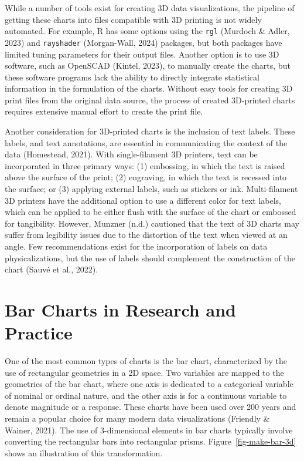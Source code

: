 \documentclass[phd]{nuthesis}
\begin{document}
While a number of tools exist for creating 3D data visualizations, the
pipeline of getting these charts into files compatible with 3D printing
is not widely automated. For example, R has some options using the
\texttt{rgl} (Murdoch \& Adler, 2023) and \texttt{rayshader}
(Morgan-Wall, 2024) packages, but both packages have limited tuning
parameters for their output files. Another option is to use 3D software,
such as OpenSCAD (Kintel, 2023), to manually create the charts, but
these software programs lack the ability to directly integrate
statistical information in the formulation of the charts. Without easy
tools for creating 3D print files from the original data source, the
process of created 3D-printed charts requires extensive manual effort to
create the print file.

Another consideration for 3D-printed charts is the inclusion of text
labels. These labels, and text annotations, are essential in
communicating the context of the data (Homestead, 2021). With
single-filament 3D printers, text can be incorporated in three primary
ways: (1) embossing, in which the text is raised above the surface of
the print; (2) engraving, in which the text is recessed into the
surface; or (3) applying external labels, such as stickers or ink.
Multi-filament 3D printers have the additional option to use a different
color for text labels, which can be applied to be either flush with the
surface of the chart or embossed for tangibility. However, Munzner
(n.d.) cautioned that the text of 3D charts may suffer from legibility
issues due to the distortion of the text when viewed at an angle. Few
recommendations exist for the incorporation of labels on data
physicalizations, but the use of labels should complement the
construction of the chart (Sauvé et al., 2022).

\section{Bar Charts in Research and
Practice}\label{bar-charts-in-research-and-practice}

One of the most common types of charts is the bar chart, characterized
by the use of rectangular geometries in a 2D space. Two variables are
mapped to the geometries of the bar chart, where one axis is dedicated
to a categorical variable of nominal or ordinal nature, and the other
axis is for a continuous variable to denote magnitude or a response.
These charts have been used over 200 years and remain a popular choice
for many modern data visualizations (Friendly \& Wainer, 2021). The use
of 3-dimensional elements in bar charts typically involve converting the
rectangular bars into rectangular prisms. Figure~\ref{fig-make-bar-3d}
shows an illustration of this transformation.
\end{document}
